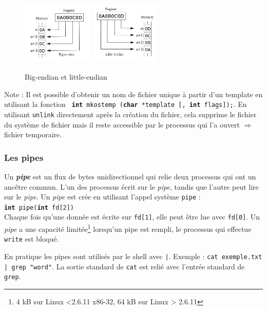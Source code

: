 \begin{figure}[!h]
  \centering\includegraphics[width=0.3\textwidth]{bigendian}
  \includegraphics[width=0.3\textwidth]{littleendian}
  \caption{\label{fig:biglittleendian} Big-endian et little-endian}
\end{figure}

Note : Il est possible d'obtenir un nom de fichier unique à partir d'un template en utilisant la fonction \texttt{ \textbf{int} mkostemp (\textbf{char} *template [, \textbf{int} flags]);}. En utilisant \texttt{unlink} directement après la création du fichier, cela supprime le fichier du système de fichier mais il reste accessible par le processus qui l'a ouvert $\Rightarrow$ fichier temporaire.


\subsubsection{Les pipes}
Un \textit{\textbf{pipe}} est un flux de bytes unidirectionnel qui relie deux processus qui ont un ancêtre commun. L'un des processus écrit sur le \textit{pipe}, tandis que l'autre peut lire sur le \textit{pipe}. Un \textit{pipe} est crée en utilisant l'appel système \texttt{pipe} : \\
\texttt{\textbf{int} pipe(\textbf{int} fd[2])}\\
Chaque fois qu'une donnée est écrite sur \texttt{fd[1]}, elle peut être lue avec \texttt{fd[0]}.
Un \textit{pipe} a une capacité limitée\footnote{4 kB sur Linux <2.6.11 x86-32, 64 kB sur Linux > 2.6.11} lorsqu'un pipe est rempli, le processus qui effectue \texttt{write} est bloqué.


En pratique les pipes sont utilisés par le shell avec \texttt{|}. Exemple : \texttt{cat exemple.txt | grep "word"}. La sortie standard de \texttt{cat} est relié avec l'entrée standard de \texttt{grep}.

